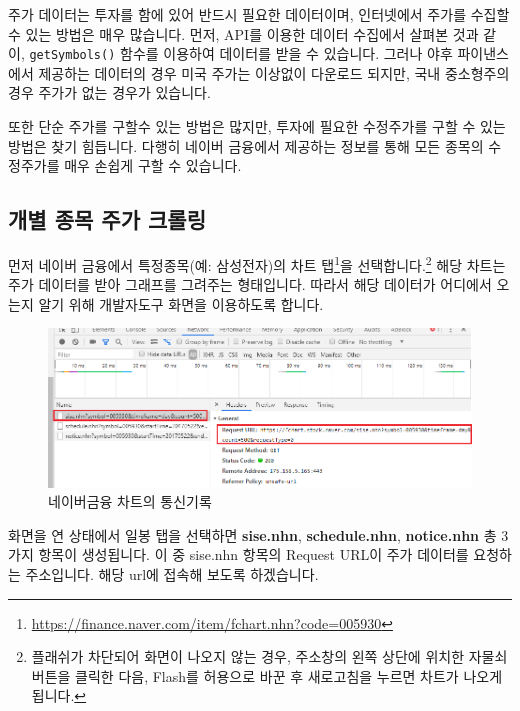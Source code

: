\documentclass[12pt,]{book}
\let\rmarkdownfootnote\footnote%
\def\footnote{\protect\rmarkdownfootnote}
\begin{document}
주가 데이터는 투자를 함에 있어 반드시 필요한 데이터이며, 인터넷에서 주가를 수집할 수 있는 방법은 매우 많습니다. 먼저, API를 이용한 데이터 수집에서 살펴본 것과 같이, \texttt{getSymbols()} 함수를 이용하여 데이터를 받을 수 있습니다. 그러나 야후 파이낸스에서 제공하는 데이터의 경우 미국 주가는 이상없이 다운로드 되지만, 국내 중소형주의 경우 주가가 없는 경우가 있습니다.

또한 단순 주가를 구할수 있는 방법은 많지만, 투자에 필요한 수정주가를 구할 수 있는 방법은 찾기 힘듭니다. 다행히 네이버 금융에서 제공하는 정보를 통해 모든 종목의 수정주가를 매우 손쉽게 구할 수 있습니다.

\hypertarget{section-25}{%
\subsection{개별 종목 주가 크롤링}\label{section-25}}

먼저 네이버 금융에서 특정종목(예: 삼성전자)의 차트 탭\footnote{\url{https://finance.naver.com/item/fchart.nhn?code=005930}}을 선택합니다.\footnote{플래쉬가 차단되어 화면이 나오지 않는 경우, 주소창의 왼쪽 상단에 위치한 자물쇠 버튼을 클릭한 다음, Flash를 허용으로 바꾼 후 새로고침을 누르면 차트가 나오게 됩니다.} 해당 차트는 주가 데이터를 받아 그래프를 그려주는 형태입니다. 따라서 해당 데이터가 어디에서 오는지 알기 위해 개발자도구 화면을 이용하도록 합니다.

\begin{figure}[h]

{\centering \includegraphics[width=0.7\linewidth]{images/crawl_practice_price2} 

}

\caption{네이버금융 차트의 통신기록}\label{fig:unnamed-chunk-2}
\end{figure}

화면을 연 상태에서 일봉 탭을 선택하면 \textbf{sise.nhn}, \textbf{schedule.nhn}, \textbf{notice.nhn} 총 3가지 항목이 생성됩니다. 이 중 sise.nhn 항목의 Request URL이 주가 데이터를 요청하는 주소입니다. 해당 url에 접속해 보도록 하겠습니다.
\end{document}

